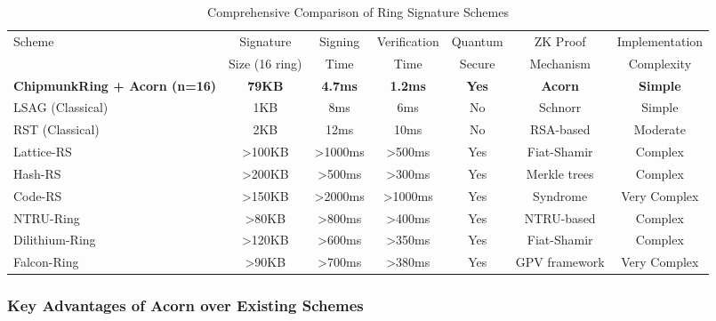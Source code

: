 \documentclass[11pt,a4paper]{article}
\begin{document}
\begin{table}[h]
\centering
\caption{Comprehensive Comparison of Ring Signature Schemes}
\label{tab:comprehensive-comparison}
\begin{tabular}{@{}lcccccc@{}}
\toprule
\multirow{2}{*}{Scheme} & Signature & Signing & Verification & Quantum & ZK Proof & Implementation \\
 & Size (16 ring) & Time & Time & Secure & Mechanism & Complexity \\
\midrule
\textbf{ChipmunkRing + Acorn (n=16)} & \textbf{79KB} & \textbf{4.7ms} & \textbf{1.2ms} & \textbf{Yes} & \textbf{Acorn} & \textbf{Simple} \\
LSAG (Classical) & 1KB & 8ms & 6ms & No & Schnorr & Simple \\
RST (Classical) & 2KB & 12ms & 10ms & No & RSA-based & Moderate \\
Lattice-RS \cite{lattice-rings} & >100KB & >1000ms & >500ms & Yes & Fiat-Shamir & Complex \\
Hash-RS \cite{hash-rings} & >200KB & >500ms & >300ms & Yes & Merkle trees & Complex \\
Code-RS \cite{code-rings} & >150KB & >2000ms & >1000ms & Yes & Syndrome & Very Complex \\
NTRU-Ring & >80KB & >800ms & >400ms & Yes & NTRU-based & Complex \\
Dilithium-Ring & >120KB & >600ms & >350ms & Yes & Fiat-Shamir & Complex \\
Falcon-Ring & >90KB & >700ms & >380ms & Yes & GPV framework & Very Complex \\
\bottomrule
\end{tabular}
\end{table}

\subsubsection{Key Advantages of Acorn over Existing Schemes}
\end{document}
